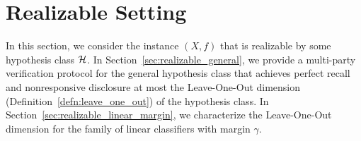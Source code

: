\section{Realizable Setting}

In this section, we consider the instance $(X,f)$ that is realizable by some hypothesis class $\mathcal{H}$. 
In Section~\ref{sec:realizable_general}, we provide a multi-party verification  protocol for the general hypothesis class that achieves perfect recall and nonresponsive disclosure at most the Leave-One-Out dimension (Definition~\ref{defn:leave_one_out}) of the hypothesis class.
In Section~\ref{sec:realizable_linear_margin}, we characterize the Leave-One-Out dimension for the family of linear classifiers with margin $\gamma$.



